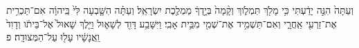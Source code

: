 \documentclass{openreader}
\begin{document}
וְעַתָּה֙ הִנֵּ֣ה יָדַ֔עְתִּי כִּ֥י מָלֹ֖ךְ תִּמְלֹ֑וךְ וְקָ֨מָה֙ בְּיָ֣דְךָ֔ מַמְלֶ֖כֶת יִשְׂרָאֵֽל׃ 
וְעַתָּ֗ה הִשָּׁ֤בְעָה לִּי֙ בַּֽיהוָ֔ה אִם־תַּכְרִ֥ית אֶת־זַרְעִ֖י אַֽחֲרָ֑י וְאִם־תַּשְׁמִ֥יד אֶת־שְׁמִ֖י מִבֵּ֥ית אָבִֽי׃ 
וַיִּשָּׁבַ֥ע דָּוִ֖ד לְשָׁא֑וּל וַיֵּ֤לֶךְ שָׁאוּל֙ אֶל־בֵּיתֹ֔ו וְדָוִד֙ וַֽאֲנָשָׁ֔יו עָל֖וּ עַל־הַמְּצוּדָֽה׃ פ 
\end{document}
